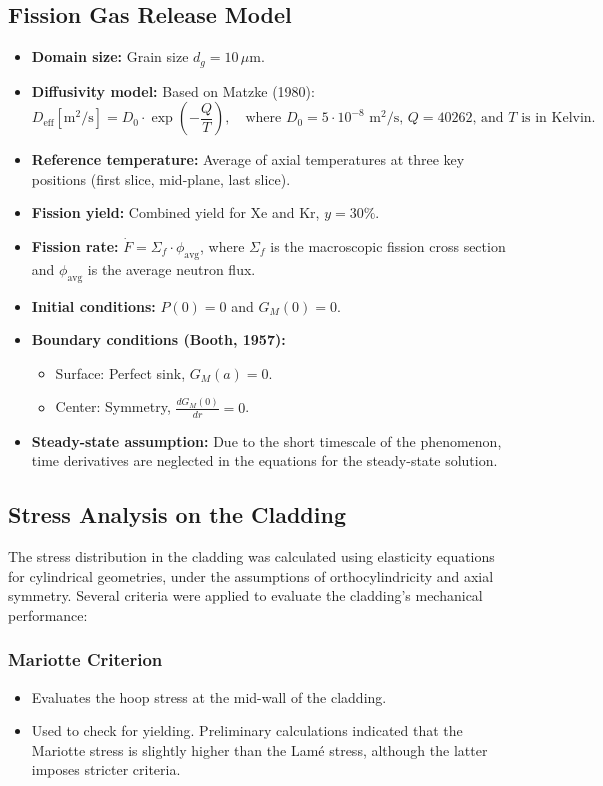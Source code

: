\documentclass[11pt,a4paper,twoside]{article}
\begin{document}
\subsection{Fission Gas Release Model}
\begin{itemize}
    \item \textbf{Domain size:} Grain size $d_g = 10 \, \mu \text{m}$.
    \item \textbf{Diffusivity model:} Based on Matzke (1980):
    \[
    D_{\text{eff}} [\text{m}^2/\text{s}] = D_0 \cdot \exp\left(-\frac{Q}{T}\right), \quad \text{where } D_0 = 5 \cdot 10^{-8} \text{ m}^2/\text{s}, \, Q = 40262 \text{, and } T \text{ is in Kelvin.}
    \]
    \item \textbf{Reference temperature:} Average of axial temperatures at three key positions (first slice, mid-plane, last slice).
    \item \textbf{Fission yield:} Combined yield for Xe and Kr, $y = 30\%$.
    \item \textbf{Fission rate:} $\dot{F} = \Sigma_f \cdot \phi_{\text{avg}}$, where $\Sigma_f$ is the macroscopic fission cross section and $\phi_{\text{avg}}$ is the average neutron flux.
    \item \textbf{Initial conditions:} $P(0) = 0$ and $G_M(0) = 0$.
    \item \textbf{Boundary conditions (Booth, 1957):}
    \begin{itemize}
        \item Surface: Perfect sink, $G_M(a) = 0$.
        \item Center: Symmetry, $\frac{dG_M(0)}{dr} = 0$.
    \end{itemize}
    \item \textbf{Steady-state assumption:} Due to the short timescale of the phenomenon, time derivatives are neglected in the equations for the steady-state solution.
\end{itemize}

\subsection{Stress Analysis on the Cladding}
The stress distribution in the cladding was calculated using elasticity equations for cylindrical geometries, under the assumptions of orthocylindricity and axial symmetry. Several criteria were applied to evaluate the cladding's mechanical performance:

\subsubsection{Mariotte Criterion}
\begin{itemize}
    \item Evaluates the hoop stress at the mid-wall of the cladding.
    \item Used to check for yielding. Preliminary calculations indicated that the Mariotte stress is slightly higher than the Lamé stress, although the latter imposes stricter criteria.
\end{itemize}
\end{document}
